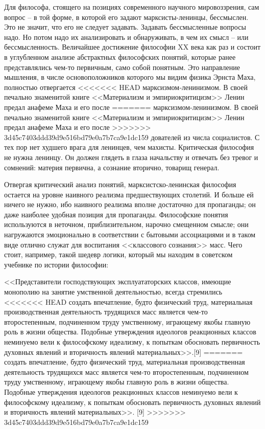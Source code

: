 \documentclass{book}
\begin{document}
Для философа, стоящего на позициях современного науч­ного мировоззрения, сам вопрос -- в той форме, в которой его задают 
марксисты-ленинцы, бессмыслен. Это не значит, что его не следует задавать. Задавать бессмысленные вопросы надо. Но потом надо их 
анализировать и обнаруживать, в чем их смысл -- или бессмысленность. Величайшее достижение фило­софии XX века как раз и состоит в 
углубленном анализе абст­рактных философских понятий, которые ранее представлялись чем-то первичным, само собой понятным. Это 
направление мышления, в числе основоположников которого мы видим физика Эрнста Маха, полностью отвергается 
<<<<<<< HEAD
марксизмом‑ленинизмом. В своей печально знаменитой книге <<Материализм и эмпириокритицизм>> Ленин предал анафеме Маха и его после­
=======
марксизмом-ленинизмом. В своей печально знаменитой книге <<Материализм и эмпириокритицизм>> Ленин предал анафеме Маха и его после­
>>>>>>> 3d45c7403ddd39d9e516bd79e0a7b7ca9e1dc159
дователей из числа социалистов. С тех пор нет худшего врага для ленинцев, чем махисты. Критическая философия не нужна ленинцу. 
Он должен глядеть в глаза начальству и отвечать без тревог и сомнений: материя первична, а сознание вторично, товарищ генерал.

Отвергая критический анализ понятий, марксистско-ленинская философия остается на уровне наивного реализма пред­шествующих 
столетий. И больше ей ничего не нужно, ибо наив­ного реализма вполне достаточно для пропаганды; он даже наиболее удобная позиция 
для пропаганды. Философские поня­тия используются в неточном, приблизительном, нарочно сме­щенном смысле; они нагружаются 
эмоционально в соответст­вии с бытовыми ассоциациями и в таком виде отлично служат для воспитания <<классового сознания>> масс. 
Чего стоит, напри­мер, такой шедевр логики, который мы находим в советском учебнике по истории философии:

<<Представители господствующих эксплуататорских классов, имеющие монополию на занятие умственной деятельностью, всегда стремились 
<<<<<<< HEAD
создать впечатление, будто физический труд, материальная производственная деятельность трудящихся масс является чем‑то 
второстепенным, подчиненном труду умствен­ному, играющему якобы главную роль в жизни общества. Подобные утверждения идеологов 
реакционных классов неми­нуемо вели к философскому идеализму, к попыткам обосно­вать первичность духовных явлений и вторичность 
явлений ма­териальных>>.[9]
=======
создать впечатление, будто физический труд, материальная производственная деятельность трудящихся масс является чем-то 
второстепенным, подчиненном труду умствен­ному, играющему якобы главную роль в жизни общества. Подобные утверждения идеологов 
реакционных классов неми­нуемо вели к философскому идеализму, к попыткам обосно­вать первичность духовных явлений и вторичность 
явлений ма­териальных>>. [9]
>>>>>>> 3d45c7403ddd39d9e516bd79e0a7b7ca9e1dc159
\end{document}
